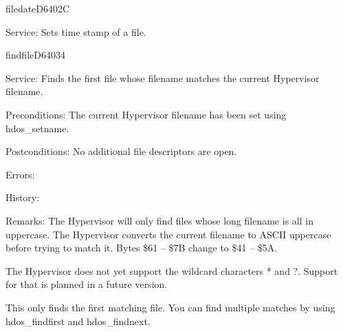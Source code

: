 \newpage
\begin{hyppotrap}{filedate}{D640}{2C}
\item [Service:]
  Sets time stamp of a file.
\notimplemented
\end{hyppotrap}


%
\newpage
\begin{hyppotrap}{findfile}{D640}{34}
\item [Service:]
  Finds the first file whose filename matches the current Hypervisor filename.
\item [Preconditions:]
  The current Hypervisor filename has been set using hdos\_setname.
\item [Postconditions:]
  No additional file descriptors are open.
\item [Errors:]
\item [History:]
\item [Remarks:]
  The Hypervisor will only find files whose long filename is all in uppercase.
  The Hypervisor converts the current filename to ASCII uppercase before trying
  to match it. Bytes \$61 -- \$7B change to \$41 -- \$5A.

  The Hypervisor does not yet support the wildcard characters * and ?. Support
  for that is planned in a future version.

  This only finds the first matching file. You can find multiple matches by
  using hdos\_findfirst and hdos\_findnext.
\end{hyppotrap}


